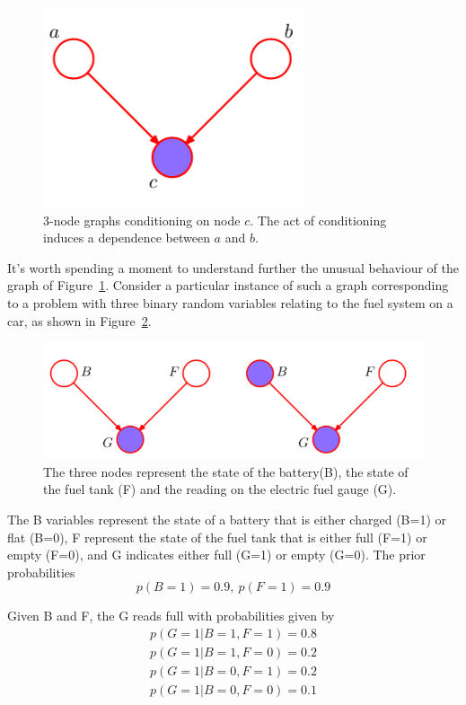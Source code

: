 \documentclass[5p,sort&compress]{elsarticle}
\begin{document}
\begin{figure}[ht]
     \centering
     \includegraphics[width =0.6\linewidth]{figure/figure8_20.png}
     \caption{3-node graphs conditioning on node $c$. The act of conditioning induces a dependence between $a$ and $b$.}
     \label{fig:8_20}
\end{figure}

It's worth spending a moment to understand further the unusual behaviour of the graph of Figure~\ref{fig:8_20}. Consider a particular instance of such a graph corresponding to a problem with three binary random variables relating to the fuel system on a car, as shown in Figure~\ref{fig:8_21}.

\begin{figure}[ht]
     \centering
     \includegraphics[width =\linewidth]{figure/figure8_21.png}
     \caption{The three nodes represent the state of the battery(B), the state of the fuel tank (F) and the reading on the electric fuel gauge (G).}
     \label{fig:8_21}
\end{figure}

The B variables represent the state of a battery that is either charged (B=1) or flat (B=0), F represent the state of the fuel tank that is either full (F=1) or empty (F=0), and G indicates either full (G=1) or empty (G=0). The prior probabilities
\begin{equation}
    p(B=1) = 0.9, ~
    p(F=1) = 0.9
\end{equation}

Given B and F, the G reads full with probabilities given by
\begin{equation}
\begin{array}{l}{p(G=1 | B=1, F=1)=0.8} \\ {p(G=1 | B=1, F=0)=0.2} \\ {p(G=1 | B=0, F=1)=0.2} \\ {p(G=1 | B=0, F=0)=0.1}\end{array}
\end{equation}
\end{document}
